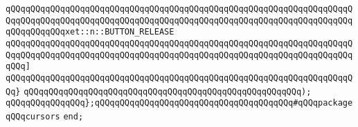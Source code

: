 \verb|qQQqqQQqqQQqqQQqqQQqqQQqqQQqqQQqqQQqqQQqqQQqqQQqqQQqqQQqqQQqqQQqqQQqqQQqqQQqqQQqqQQqqQQqqQQqqQQqqQQqqQQqqQQqqQQqqQQqqQQqqQQqqQQqqQQqqQQqqQQqqQQqqQQqqQQqxet::n::BUTTON_RELEASE|\newline
\verb|qQQqqQQqqQQqqQQqqQQqqQQqqQQqqQQqqQQqqQQqqQQqqQQqqQQqqQQqqQQqqQQqqQQqqQQqqQQqqQQqqQQqqQQqqQQqqQQqqQQqqQQqqQQqqQQqqQQqqQQqqQQqqQQqqQQqqQQqqQQqqQQq]|\newline
\verb|qQQqqQQqqQQqqQQqqQQqqQQqqQQqqQQqqQQqqQQqqQQqqQQqqQQqqQQqqQQqqQQqqQQqqQQq}|\newline
\verb|qQQqqQQqqQQqqQQqqQQqqQQqqQQqqQQqqQQqqQQqqQQqqQQqqQQqqQQq);|\newline
\newline
\verb|qQQqqQQqqQQqqQQq};qQQqqQQqqQQqqQQqqQQqqQQqqQQqqQQqqQQqqQQq#qQQqpackageqQQqcursors|\newline
\newline
\verb|end;|\newline
\newline

